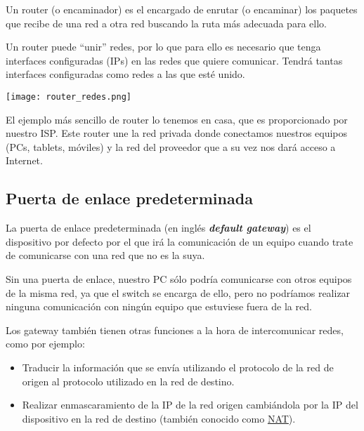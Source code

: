 Un router (o encaminador) es el encargado de enrutar (o encaminar) los paquetes que recibe de una red a otra red buscando la ruta más adecuada para ello.

Un router puede “unir” redes, por lo que para ello es necesario que tenga interfaces configuradas (IPs) en las redes que quiere comunicar. Tendrá tantas interfaces configuradas como redes a las que esté unido.


\begin{center}
    \vspace{-15pt}
    \texttt{[image: router\_redes.png]}
    \vspace{-5pt}
    \vspace{-15pt}
\end{center}

El ejemplo más sencillo de router lo tenemos en casa, que es proporcionado por nuestro ISP. Este router une la red privada donde conectamos nuestros equipos (PCs, tablets, móviles) y la red del proveedor que a su vez nos dará acceso a Internet.


\subsection{Puerta de enlace predeterminada}
La puerta de enlace predeterminada (en inglés \textit{\textbf{default gateway}}) es el dispositivo por defecto por el que irá la comunicación de un equipo cuando trate de comunicarse con una red que no es la suya.

Sin una puerta de enlace, nuestro PC sólo podría comunicarse con otros equipos de la misma red, ya que el switch se encarga de ello, pero no podríamos realizar ninguna comunicación con ningún equipo que estuviese fuera de la red.


Los gateway también tienen otras funciones a la hora de intercomunicar redes, como por ejemplo:
\begin{itemize}
    \item Traducir la información que se envía utilizando el protocolo de la red de origen al protocolo utilizado en la red de destino.
    \item Realizar enmascaramiento de la IP de la red origen cambiándola por la IP del dispositivo en la red de destino (también conocido como \hyperlink{nat}{NAT}).
\end{itemize}

